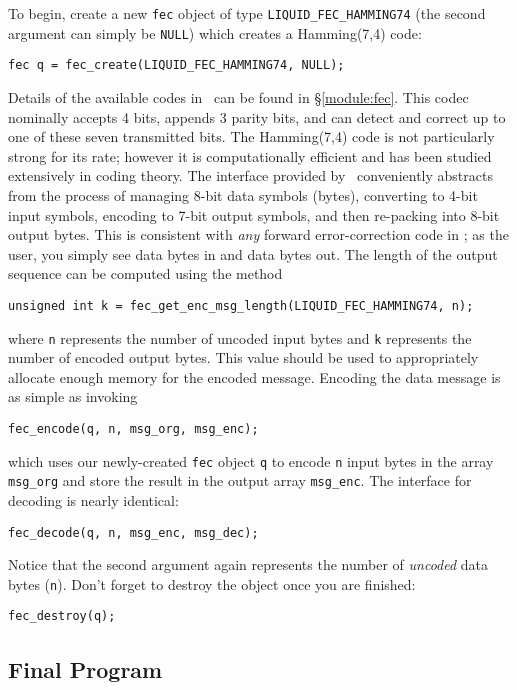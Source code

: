To begin, create a new {\tt fec} object of type {\tt LIQUID\_FEC\_HAMMING74}
(the second argument can simply be {\tt NULL})
which creates a Hamming(7,4) code:
%
\begin{Verbatim}[fontsize=\small]
    fec q = fec_create(LIQUID_FEC_HAMMING74, NULL);
\end{Verbatim}
%
Details of the available codes in \liquid\ can be found in
\S\ref{module:fec}.
This codec nominally accepts 4 bits, appends 3 parity bits, and can
detect and correct up to one of these seven transmitted bits.
The Hamming(7,4) code is not particularly strong for its rate;
however it is computationally efficient and has been studied extensively
in coding theory.
The interface provided by \liquid\ conveniently abstracts from the
process of managing 8-bit data symbols (bytes), converting to 4-bit
input symbols, encoding to 7-bit output symbols, and then re-packing
into 8-bit output bytes.
This is consistent with {\em any} forward error-correction code in
\liquid;
as the user, you simply see data bytes in and data bytes out.
The length of the output sequence can be computed using the method
%
\begin{Verbatim}[fontsize=\small]
    unsigned int k = fec_get_enc_msg_length(LIQUID_FEC_HAMMING74, n);
\end{Verbatim}
%
where {\tt n} represents the number of uncoded input bytes
and   {\tt k} represents the number of encoded output bytes.
This value should be used to appropriately allocate enough memory for
the encoded message.
%
Encoding the data message is as simple as invoking
%
\begin{Verbatim}[fontsize=\small]
    fec_encode(q, n, msg_org, msg_enc);
\end{Verbatim}
%
which uses our newly-created {\tt fec} object {\tt q} to encode {\tt n}
input bytes in the array {\tt msg\_org} and store the result in the
output array {\tt msg\_enc}.
The interface for decoding is nearly identical:
%
\begin{Verbatim}[fontsize=\small]
    fec_decode(q, n, msg_enc, msg_dec);
\end{Verbatim}
%
Notice that the second argument again represents the number of
{\em uncoded} data bytes ({\tt n}).
Don't forget to destroy the object once you are finished:
%
\begin{Verbatim}[fontsize=\small]
    fec_destroy(q);
\end{Verbatim}
%


\subsection{Final Program}
\label{tutorial:fec:completed}

